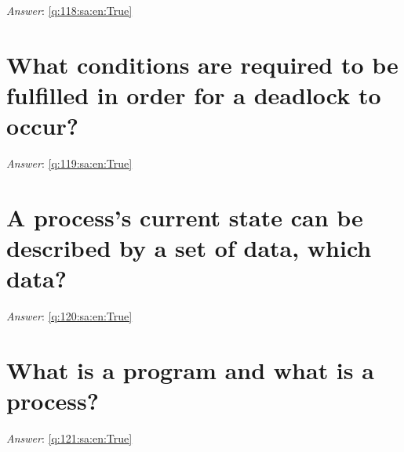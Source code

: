 \documentclass[a4paper,11pt,oneside]{book}
\begin{document}
\begin{sloppypar}
\vspace{2cm}

\noindent\makebox[\textwidth]{\hrulefill}

\vspace{1cm}

\textit{Answer}: \autoref{q:118:sa:en:True}



\section{What conditions are required to be fulfilled in order for a deadlock to occur?}

\label{q:119:sa:en:False}

\vspace{2cm}

\noindent\makebox[\textwidth]{\hrulefill}

\vspace{1cm}

\textit{Answer}: \autoref{q:119:sa:en:True}



\section{A process's current state can be described by a set of data, which data?}

\label{q:120:sa:en:False}

\vspace{2cm}

\noindent\makebox[\textwidth]{\hrulefill}

\vspace{1cm}

\textit{Answer}: \autoref{q:120:sa:en:True}



\section{What is a program and what is a process?}

\label{q:121:sa:en:False}

\vspace{2cm}

\noindent\makebox[\textwidth]{\hrulefill}

\vspace{1cm}

\textit{Answer}: \autoref{q:121:sa:en:True}




\end{sloppypar}
\end{document}
